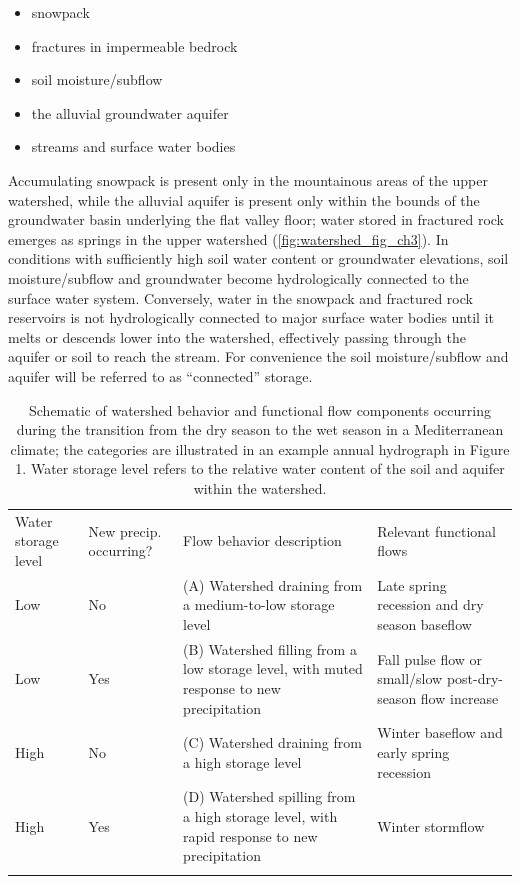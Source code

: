 \documentclass[hess, manuscript]{copernicus}
\providecommand{\tightlist}{%
  \setlength{\itemsep}{0pt}\setlength{\parskip}{0pt}}
\begin{document}
\begin{itemize}
\tightlist
\item
  snowpack
\item
  fractures in impermeable bedrock
\item
  soil moisture/subflow
\item
  the alluvial groundwater aquifer
\item
  streams and surface water bodies
\end{itemize}

Accumulating snowpack is present only in the mountainous areas of the
upper watershed, while the alluvial aquifer is present only within the
bounds of the groundwater basin underlying the flat valley floor; water
stored in fractured rock emerges as springs in the upper watershed
\citep{Mack1958} (\autoref{fig:watershed_fig_ch3}). In conditions with
sufficiently high soil water content or groundwater elevations, soil
moisture/subflow and groundwater become hydrologically connected to the
surface water system. Conversely, water in the snowpack and fractured
rock reservoirs is not hydrologically connected to major surface water
bodies until it melts or descends lower into the watershed, effectively
passing through the aquifer or soil to reach the stream. For convenience
the soil moisture/subflow and aquifer will be referred to as
``connected'' storage.

\begin{table}[t]
\caption{Schematic of watershed behavior and functional flow components occurring during the transition from the dry season to the wet season in a Mediterranean climate; the categories are illustrated in an example annual hydrograph in Figure 1. Water storage level refers to the relative water content of the soil and aquifer within the watershed.}
\label{tab:watershed_modes_tab}
\begin{tabular}{p{1.8cm} p{1.6cm} p{4.8cm} p{5cm}}
\tophline
Water storage level & New precip. occurring? & Flow behavior description & Relevant functional flows \\
\middlehline
 Low & No & (A) Watershed draining from a medium-to-low storage level & Late spring recession and dry season baseflow \\ 
 \middlehline
Low & Yes & (B) Watershed filling from a low storage level, with muted response to new precipitation & Fall pulse flow or small/slow post-dry-season flow increase \\
\middlehline
High & No & (C) Watershed draining from a high storage level & Winter baseflow and early spring recession \\
\middlehline
High & Yes & (D) Watershed spilling from a high storage level, with rapid response to new precipitation & Winter stormflow\\
\bottomhline
\end{tabular}
\belowtable{}
\end{table}
\end{document}
